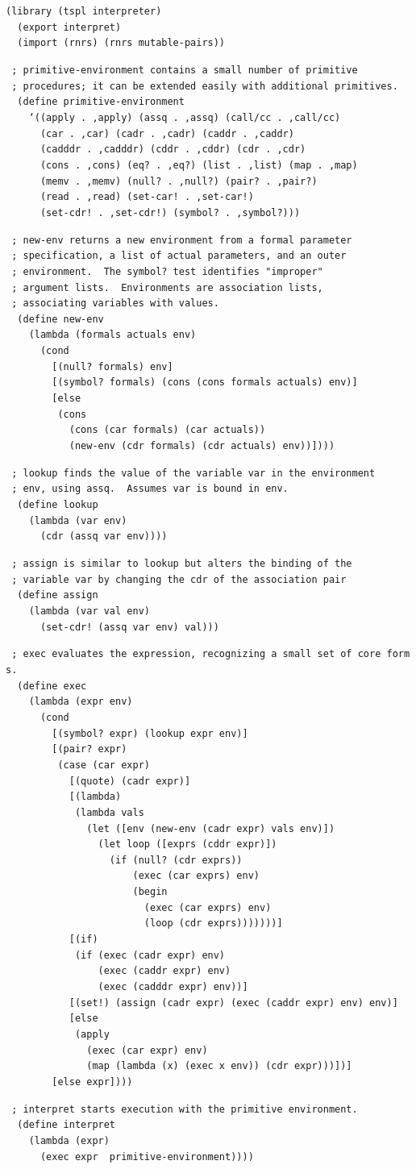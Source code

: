 \begin{alltt}
(library (tspl interpreter)
  (export interpret)
  (import (rnrs) (rnrs mutable-pairs))

 ; primitive-environment contains a small number of primitive
 ; procedures; it can be extended easily with additional primitives.
  (define primitive-environment
    `((apply . ,apply) (assq . ,assq) (call/cc . ,call/cc)
      (car . ,car) (cadr . ,cadr) (caddr . ,caddr)
      (cadddr . ,cadddr) (cddr . ,cddr) (cdr . ,cdr)
      (cons . ,cons) (eq? . ,eq?) (list . ,list) (map . ,map)
      (memv . ,memv) (null? . ,null?) (pair? . ,pair?)
      (read . ,read) (set-car! . ,set-car!)
      (set-cdr! . ,set-cdr!) (symbol? . ,symbol?)))

 ; new-env returns a new environment from a formal parameter
 ; specification, a list of actual parameters, and an outer
 ; environment.  The symbol? test identifies "improper"
 ; argument lists.  Environments are association lists,
 ; associating variables with values.
  (define new-env
    (lambda (formals actuals env)
      (cond
        [(null? formals) env]
        [(symbol? formals) (cons (cons formals actuals) env)]
        [else
         (cons
           (cons (car formals) (car actuals))
           (new-env (cdr formals) (cdr actuals) env))])))

 ; lookup finds the value of the variable var in the environment
 ; env, using assq.  Assumes var is bound in env.
  (define lookup
    (lambda (var env)
      (cdr (assq var env))))

 ; assign is similar to lookup but alters the binding of the
 ; variable var by changing the cdr of the association pair
  (define assign
    (lambda (var val env)
      (set-cdr! (assq var env) val)))

 ; exec evaluates the expression, recognizing a small set of core forms.
  (define exec
    (lambda (expr env)
      (cond
        [(symbol? expr) (lookup expr env)]
        [(pair? expr)
         (case (car expr)
           [(quote) (cadr expr)]
           [(lambda)
            (lambda vals
              (let ([env (new-env (cadr expr) vals env)])
                (let loop ([exprs (cddr expr)])
                  (if (null? (cdr exprs))
                      (exec (car exprs) env)
                      (begin
                        (exec (car exprs) env)
                        (loop (cdr exprs)))))))]
           [(if)
            (if (exec (cadr expr) env)
                (exec (caddr expr) env)
                (exec (cadddr expr) env))]
           [(set!) (assign (cadr expr) (exec (caddr expr) env) env)]
           [else
            (apply
              (exec (car expr) env)
              (map (lambda (x) (exec x env)) (cdr expr)))])]
        [else expr])))

 ; interpret starts execution with the primitive environment.
  (define interpret
    (lambda (expr)
      (exec expr  primitive-environment))))
\end{alltt}

